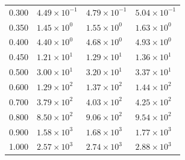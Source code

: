 \documentclass[onecolumn,notitlepage]{revtex4-1}
\begin{document}
\begin{table}[ht]
\begin{minipage}{0.45\linewidth}
\begin{tabular}{| c | l | l | l |}
0.300   & $4.49 \times 10^{-1}$  & $4.79 \times 10^{-1}$  & $5.04 \times 10^{-1}$  \\
0.350  & $1.45 \times 10^{0}$   & $1.55 \times 10^{0}$   & $1.63 \times 10^{0}$  \\
0.400   & $4.40 \times 10^{0}$   & $4.68 \times 10^{0}$   & $4.93 \times 10^{0}$   \\
0.450  & $1.21 \times 10^{1}$   & $1.29 \times 10^{1}$   & $1.36 \times 10^{1}$   \\
0.500   & $3.00 \times 10^{1}$   & $3.20 \times 10^{1}$   & $3.37 \times 10^{1}$   \\
0.600   & $1.29 \times 10^{2}$   & $1.37 \times 10^{2}$   & $1.44 \times 10^{2}$   \\
0.700   & $3.79 \times 10^{2}$   & $4.03 \times 10^{2}$   & $4.25 \times 10^{2}$   \\
0.800   & $8.50 \times 10^{2}$   & $9.06 \times 10^{2}$   & $9.54 \times 10^{2}$   \\
0.900   & $1.58 \times 10^{3}$   & $1.68 \times 10^{3}$   & $1.77 \times 10^{3}$   \\
1.000   & $2.57 \times 10^{3}$   & $2.74 \times 10^{3}$   & $2.88 \times 10^{3}$   \\
\hline
\end{tabular}
\end{minipage}
\end{table}
\end{document}

